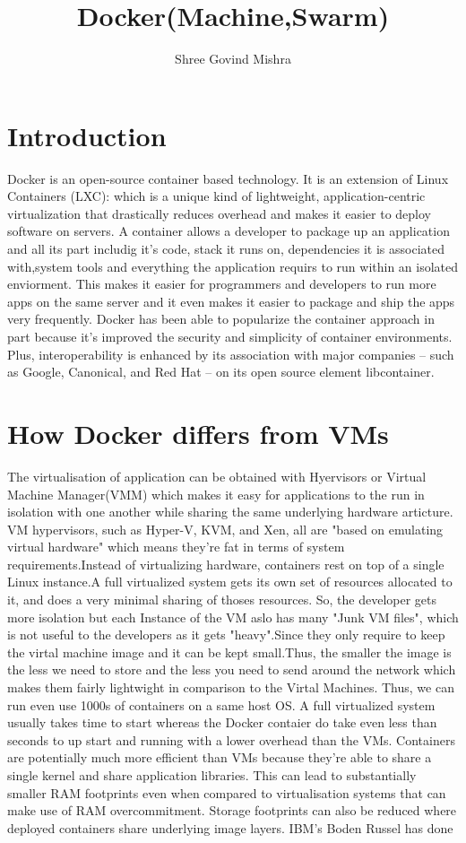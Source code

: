 \documentclass[9pt,twocolumn,twoside]{styles/osajnl}
\title{Docker(Machine,Swarm)}
\author[1]{Shree Govind Mishra}
\affil[1]{School of Informatics and Computing, Bloomington, IN 47408, U.S.A.}
\affil[*]{Corresponding authors:shremish@indiana.edu and govindmisharaalld@gmail.com}
\begin{document}
\maketitle


\section{Introduction}
\cite{www-docker-2}Docker is an open-source container based
technology. It is an extension of Linux Containers (LXC): which is a
unique kind of lightweight, application-centric virtualization that
drastically reduces overhead and makes it easier to deploy software on
servers. A container allows a developer to package up an application
and all its part includig it's code, stack it runs on, dependencies it
is associated with,system tools and everything the application requirs
to run within an isolated enviorment. This makes it easier for
programmers and developers to run more apps on the same server and it
even makes it easier to package and ship the apps very frequently.
Docker has been able to popularize the container approach in part
because it’s improved the security and simplicity of container
environments. Plus, interoperability is enhanced by its association
with major companies – such as Google, Canonical, and Red Hat – on its
open source element libcontainer.

\section{How Docker differs from VMs}

The virtualisation of application can be obtained with Hyervisors or
Virtual Machine Manager(VMM) which makes it easy for applications to
the run in isolation with one another while sharing the same
underlying hardware articture. VM hypervisors, such as Hyper-V, KVM,
and Xen, all are "based on emulating virtual hardware" which means
they’re fat in terms of system requirements.Instead of virtualizing
hardware, containers rest on top of a single Linux instance.A full
virtualized system gets its own set of resources allocated to it, and
does a very minimal sharing of thoses resources. So, the developer
gets more isolation but each Instance of the VM aslo has many "Junk VM
files", which is not useful to the developers as it gets "heavy".Since
they only require to keep the virtal machine image and it can be kept
small.Thus, the smaller the image is the less we need to store and the
less you need to send around the network which makes them fairly
lightwight in comparison to the Virtal Machines. Thus, we can run even
use 1000s of containers on a same host OS.
\cite{www-stackoverflow-docker}A full virtualized system usually
takes time to start whereas the Docker contaier do take even less than
seconds to up start and running with a lower overhead than the VMs.
Containers are potentially much more efficient than VMs because
they’re able to share a single kernel and share application libraries.
This can lead to substantially smaller RAM footprints even when
compared to virtualisation systems that can make use of RAM
overcommitment.  Storage footprints can also be reduced where deployed
containers share underlying image layers. IBM’s Boden Russel has done
\end{document}
